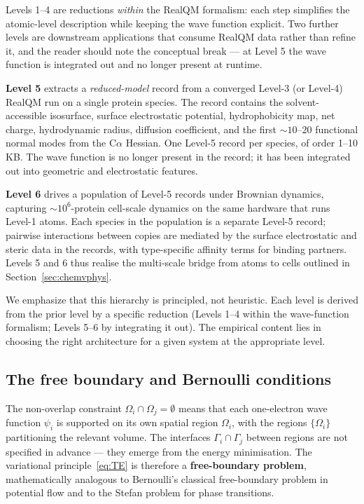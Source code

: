 \documentclass[11pt]{article}
\begin{document}
Levels 1--4 are reductions \emph{within} the RealQM formalism: each step simplifies the atomic-level description while keeping the wave function explicit. Two further levels are downstream applications that consume RealQM data rather than refine it, and the reader should note the conceptual break --- at Level 5 the wave function is integrated out and no longer present at runtime.

\textbf{Level 5} extracts a \emph{reduced-model} record from a converged Level-3 (or Level-4) RealQM run on a single protein species. The record contains the solvent-accessible isosurface, surface electrostatic potential, hydrophobicity map, net charge, hydrodynamic radius, diffusion coefficient, and the first $\sim 10$--$20$ functional normal modes from the C$\alpha$ Hessian. One Level-5 record per species, of order 1--10 KB. The wave function is no longer present in the record; it has been integrated out into geometric and electrostatic features.

\textbf{Level 6} drives a population of Level-5 records under Brownian dynamics, capturing $\sim 10^6$-protein cell-scale dynamics on the same hardware that runs Level-1 atoms. Each species in the population is a separate Level-5 record; pairwise interactions between copies are mediated by the surface electrostatic and steric data in the records, with type-specific affinity terms for binding partners. Levels 5 and 6 thus realise the multi-scale bridge from atoms to cells outlined in Section~\ref{sec:chemvphys}.

We emphasize that this hierarchy is principled, not heuristic. Each level is derived from the prior level by a specific reduction (Levels 1--4 within the wave-function formalism; Levels 5--6 by integrating it out). The empirical content lies in choosing the right architecture for a given system at the appropriate level.

\subsection{The free boundary and Bernoulli conditions}\label{sec:bernoulli}

The non-overlap constraint $\Omega_i \cap \Omega_j = \emptyset$ means that each one-electron wave function $\psi_i$ is supported on its own spatial region $\Omega_i$, with the regions $\{\Omega_i\}$ partitioning the relevant volume. The interfaces $\Gamma_i \cap \Gamma_j$ between regions are not specified in advance --- they emerge from the energy minimisation. The variational principle~\eqref{eq:TE} is therefore a \textbf{free-boundary problem}, mathematically analogous to Bernoulli's classical free-boundary problem in potential flow and to the Stefan problem for phase transitions.
\end{document}
